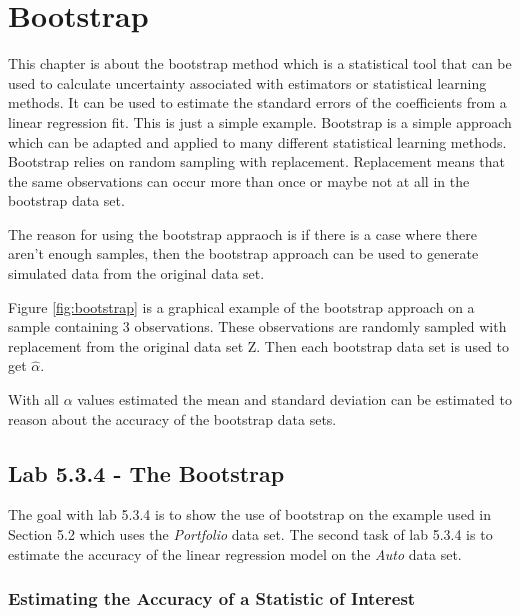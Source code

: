 \chapter{Bootstrap}
\label{chp:boots}

This chapter is about the bootstrap method which is a statistical tool that can be used to calculate uncertainty associated with estimators or statistical learning methods. It can be used to estimate the standard errors of the coefficients from a linear regression fit. This is just a simple example. Bootstrap is a simple approach which can be adapted and applied to many different statistical learning methods. Bootstrap relies on random sampling with replacement. Replacement means that the same observations can occur more than once or maybe not at all in the bootstrap data set. 

The reason for using the bootstrap appraoch is if there is a case where there aren't enough samples, then the bootstrap approach can be used to generate simulated data from the original data set.


Figure \ref{fig:bootstrap} is a graphical example of the bootstrap approach on a sample containing 3 observations. These observations are randomly sampled with replacement from the original data set Z. Then each bootstrap data set is used to get $\hat{\alpha}$.

With all $\alpha$ values estimated the mean and standard deviation can be estimated to reason about the accuracy of the bootstrap data sets.

\section{Lab 5.3.4 - The Bootstrap}

The goal with lab 5.3.4 is to show the use of bootstrap on the example used in Section 5.2\citep{ISLR} which uses the \emph{Portfolio} data set. The second task of lab 5.3.4 is to estimate the accuracy of the linear regression model on the \emph{Auto} data set.

\subsection{Estimating the Accuracy of a Statistic of Interest}

